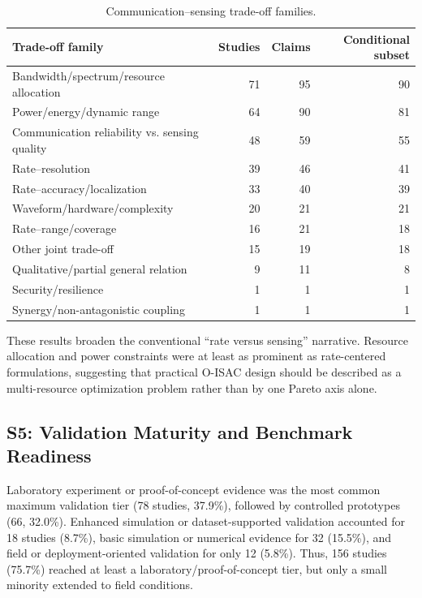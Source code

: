 \begin{table}[!t]
\caption{Communication--sensing trade-off families.}
\label{tab:s4_tradeoffs}
\centering
\begin{tabular}{lrrr}
\toprule
\textbf{Trade-off family} & \textbf{Studies} & \textbf{Claims} & \textbf{Conditional subset} \\
\midrule
Bandwidth/spectrum/resource allocation & 71 & 95 & 90 \\
Power/energy/dynamic range & 64 & 90 & 81 \\
Communication reliability vs. sensing quality & 48 & 59 & 55 \\
Rate--resolution & 39 & 46 & 41 \\
Rate--accuracy/localization & 33 & 40 & 39 \\
Waveform/hardware/complexity & 20 & 21 & 21 \\
Rate--range/coverage & 16 & 21 & 18 \\
Other joint trade-off & 15 & 19 & 18 \\
Qualitative/partial general relation & 9 & 11 & 8 \\
Security/resilience & 1 & 1 & 1 \\
Synergy/non-antagonistic coupling & 1 & 1 & 1 \\
\bottomrule
\end{tabular}
\end{table}

These results broaden the conventional ``rate versus sensing'' narrative.
Resource allocation and power constraints were at least as prominent as
rate-centered formulations, suggesting that practical O-ISAC design should be
described as a multi-resource optimization problem rather than by one Pareto
axis alone.

\subsection{S5: Validation Maturity and Benchmark Readiness}

Laboratory experiment or proof-of-concept evidence was the most common maximum
validation tier (78 studies, 37.9\%), followed by controlled prototypes (66,
32.0\%). Enhanced simulation or dataset-supported validation accounted for 18
studies (8.7\%), basic simulation or numerical evidence for 32 (15.5\%), and
field or deployment-oriented validation for only 12 (5.8\%). Thus, 156 studies
(75.7\%) reached at least a laboratory/proof-of-concept tier, but only a small
minority extended to field conditions.


